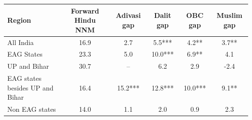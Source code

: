 \begin{tabular}{lccccc}
\hline
Region & Forward Hindu NNM & Adivasi gap & Dalit gap & OBC gap & Muslim gap \\
\hline
All India&16.9&2.7&5.5***&4.2**&3.7**\\
EAG States&23.3&5.0&10.0***&6.9**&4.1\\
UP and Bihar&30.7&--&6.2&2.9&-2.4\\
EAG states besides UP and Bihar&16.4&15.2***&12.8***&10.0***&9.1**\\
Non EAG states&14.0&1.1&2.0&0.9&2.3\\
\hline
\end{tabular}

